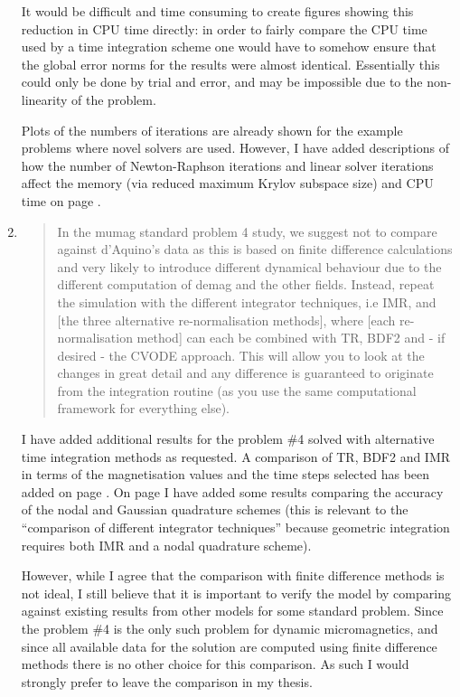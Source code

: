 \documentclass[12pt,a4paper,pdftex]{article}
\begin{document}
\begin{enumerate}
It would be difficult and time consuming to create figures showing this reduction in CPU time directly: in order to fairly compare the CPU time used by a time integration scheme one would have to somehow ensure that the global error norms for the results were almost identical.
Essentially this could only be done by trial and error, and may be impossible due to the non-linearity of the problem.

  Plots of the numbers of iterations are already shown for the example problems where novel solvers are used.
However, I have added descriptions of how the number of Newton-Raphson iterations and linear solver iterations affect the memory (via reduced maximum Krylov subspace size) and CPU time on page \pageref{mem-cpu-solver-correction}.

\item
  \begin{quotation}
    In the mumag standard problem 4 study, we suggest not to compare
    against d'Aquino's data as this is based on finite difference
    calculations and very likely to introduce different dynamical behaviour
    due to the different computation of demag and the other fields.
    Instead, repeat the simulation with the different integrator
    techniques, i.e IMR, and [the three alternative re-normalisation
    methods], where [each re-normalisation method] can each be combined with
    TR, BDF2 and - if desired - the CVODE approach. This will allow you to
    look at the changes in great detail and any difference is guaranteed to
    originate from the integration routine (as you use the same
    computational framework for everything else).
  \end{quotation}
  I have added additional results for the \mumag problem \#4 solved with alternative time integration methods as requested.
  A comparison of TR, BDF2 and IMR in terms of the magnetisation values and the time steps selected has been added on page \pageref{more-mumag4-correction-1}.
  On page \pageref{more-mumag4-correction-2} I have added some results comparing the accuracy of the nodal and Gaussian quadrature schemes (this is relevant to the ``comparison of different integrator techniques'' because geometric integration requires both IMR and a nodal quadrature scheme).

  However, while I agree that the comparison with finite difference methods is not ideal, I still believe that it is important to verify the model by comparing against existing results from other models for some standard problem.
  Since the \mumag problem \#4 is the only such problem for dynamic micromagnetics, and since all available data for the solution are computed using finite difference methods there is no other choice for this comparison.
  As such I would strongly prefer to leave the comparison in my thesis.


\end{enumerate}
\end{document}
